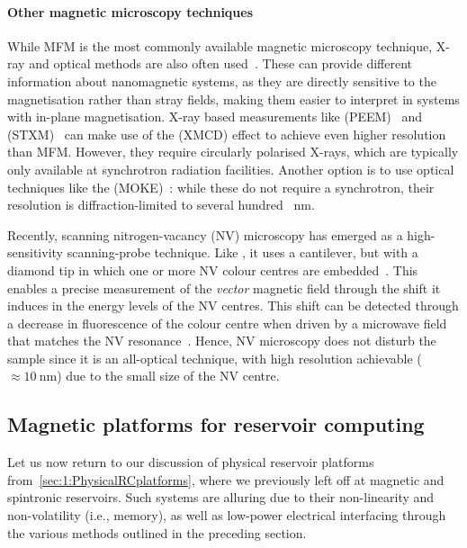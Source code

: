 \paragraph{Other magnetic microscopy techniques}
While MFM is the most commonly available magnetic microscopy technique, X-ray and optical methods are also often used~\cite{DynamicEmergence_NanomagneticSystem}.
These can provide different information about nanomagnetic systems, as they are directly sensitive to the magnetisation rather than stray fields, making them easier to interpret in systems with in-plane magnetisation.
X-ray based measurements like  (PEEM)~\cite{PEEM} and  (STXM)~\cite{Imaging_MTXM} can make use of the  (XMCD) effect to achieve even higher resolution than MFM.
However, they require circularly polarised X-rays, which are typically only available at synchrotron radiation facilities.
Another option is to use optical techniques like the  (MOKE)~\cite{KerrFaraday_book}: while these do not require a synchrotron, their resolution is diffraction-limited to several hundred \SI{}{\nano\metre}. \par
Recently, scanning nitrogen-vacancy (NV) microscopy has emerged as a high-sensitivity scanning-probe technique.
Like , it uses a cantilever, but with a diamond tip in which one or more NV colour centres are embedded~\cite{NVprospects}.
This enables a precise measurement of the \textit{vector} magnetic field through the shift it induces in the energy levels of the NV centres. %
This shift can be detected through a decrease in fluorescence of the colour centre when driven by a microwave field that matches the NV resonance~\cite{NVprinciples_QDM}.
Hence, NV microscopy does not disturb the sample since it is an all-optical technique, with high resolution achievable ($\approx \SI{10}{\nano\metre}$) due to the small size of the NV centre. %

\subsection{Magnetic platforms for reservoir computing}\label{sec:1_RC_magnetic}
Let us now return to our discussion of physical reservoir platforms from~\cref{sec:1:PhysicalRCplatforms}, where we previously left off at magnetic and spintronic reservoirs.
Such systems are alluring due to their non-linearity and non-volatility (i.e., memory), as well as low-power electrical interfacing through the various methods outlined in the preceding section.

